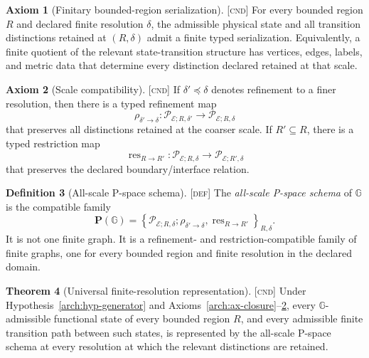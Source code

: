 \documentclass[11pt]{article}
\newcommand{\Pspace}{\ensuremath{\mathcal{P}}}
\newcommand{\Gobj}{\ensuremath{\mathbb{G}}}
\newcommand{\Defn}{\textsc{[def]}}
\newcommand{\Cnd}{\textsc{[cnd]}}
\theoremstyle{definition}
\newtheorem{sdefinition}{Definition}
\newtheorem{saxiom}[sdefinition]{Axiom}
\newtheorem{stheorem}[sdefinition]{Theorem}
\begin{document}
\begin{saxiom}[Finitary bounded-region serialization]
\label{arch:ax-finitary}
\Cnd{} For every bounded region $R$ and declared finite resolution $\delta$, the
admissible physical state and all transition distinctions retained at $(R,\delta)$
admit a finite typed serialization. Equivalently, a finite quotient of the
relevant state-transition structure has vertices, edges, labels, and metric data
that determine every distinction declared retained at that scale.
\end{saxiom}

\begin{saxiom}[Scale compatibility]
\label{arch:ax-scale}
\Cnd{} If $\delta'\preceq\delta$ denotes refinement to a finer resolution, then
there is a typed refinement map
\begin{equation}
\rho_{\delta'\to\delta}:\Pspace_{\mathcal E;R,\delta'}\longrightarrow
\Pspace_{\mathcal E;R,\delta}
\label{arch:eq-refinement}
\end{equation}
that preserves all distinctions retained at the coarser scale. If $R'\subseteq R$,
there is a typed restriction map
\begin{equation}
\operatorname{res}_{R\to R'}:\Pspace_{\mathcal E;R,\delta}\longrightarrow
\Pspace_{\mathcal E;R',\delta}
\label{arch:eq-restriction}
\end{equation}
that preserves the declared boundary/interface relation.
\end{saxiom}

\begin{sdefinition}[All-scale P-space schema]
\label{arch:def-allscale}
\Defn{} The \emph{all-scale P-space schema} of $\Gobj$ is the compatible family
\begin{equation}
\mathbf P(\Gobj)=
\left\{\Pspace_{\mathcal E;R,\delta};\rho_{\delta'\to\delta},
\operatorname{res}_{R\to R'}\right\}_{R,\delta}.
\label{arch:eq-allscale}
\end{equation}
It is not one finite graph. It is a refinement- and restriction-compatible family
of finite graphs, one for every bounded region and finite resolution in the
declared domain.
\end{sdefinition}

\begin{stheorem}[Universal finite-resolution representation]
\label{arch:thm-representation}
\Cnd{} Under Hypothesis~\ref{arch:hyp-generator} and
Axioms~\ref{arch:ax-closure}--\ref{arch:ax-scale}, every $\Gobj$-admissible
functional state of every bounded region $R$, and every admissible finite
transition path between such states, is represented by the all-scale P-space
schema at every resolution at which the relevant distinctions are retained.
\end{stheorem}
\end{document}
